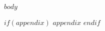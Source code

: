 \documentclass{ufdissertation} %
\begin{document}
        \setcounter{secnumdepth}{5}
        \docBodytrue


\doublespacing%
$body$


$if(appendix)$                   %
  $appendix$                     %
$endif$                          %





\end{document}
